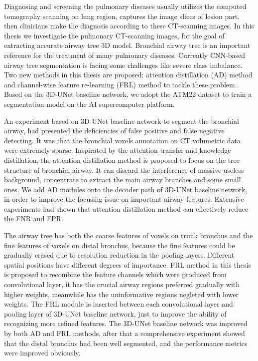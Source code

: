 \begin{abstract*}

  Diagnosing and screening the pulmonary diseases usually utilizes the computed tomography scanning on lung region, 
  captures the image slices of lesion part, then clinicians make the diagnosis according to these CT-scanning images.
  In this thesis we investigate the pulmonary CT-scanning images, for the goal of extracting accurate airway tree 
  3D model. Bronchial airway tree is an important reference for the treatment of many pulmonary diseases. Currently 
  CNN-based airway tree segmentation is facing some challenges like severe class imbalance. Two new methods in this thesis 
  are proposed: attention distillation (AD) method and channel-wise feature re-learning (FRL) method to 
  tackle these problem. Based on the 3D-UNet baseline network, we adopt the ATM22 dataset to train a segmentation model 
  on the AI supercomputer platform.

  An experiment based on 3D-UNet baseline network to segment the bronchial airway, had presented the 
  deficiencies of false positive and false negative detecting.
  It was that the bronchial voxels annotation on CT volumetric data were extremely sparse. Inspirated by the attention 
  transfer and knowledge distillation, the attention distillation method is proposed to focus on the tree structure 
  of bronchial airway. It can discard the interference of massive useless background, concentrate to extract the main airway branches 
  and some small ones. We add AD modules onto the decoder path of 3D-UNet baseline network, in order to improve the 
  focusing issue on important airway features. Extensive experiments had shown that attention distillation method can 
  effectively reduce the FNR and FPR.

  The airway tree has both the coarse features of voxels on trunk bronchus and the fine features of voxels on distal 
  bronchus, because the fine features could be gradually erased due to resolution reduction in the pooling layers. Different 
  spatial positions have different degrees of importance. FRL method in this thesis is proposed to recombine the feature channels which 
  were produced from convolutional layer, it has the crucial airway regions preferred gradually with higher weights, 
  meanwhile has the uninformative regions negleted with lower weights.
  The FRL module is inserted between each convolutional layer and pooling layer of 3D-UNet baseline network, just to 
  improve the ability of recognizing more refined features. The 3D-UNet baseline network was improved by both AD and FRL methods, 
  after that a comprehensive experiment showed that the 
  distal bronchus had been well segmented, and the performance metrics were improved obviously.

\end{abstract*}
